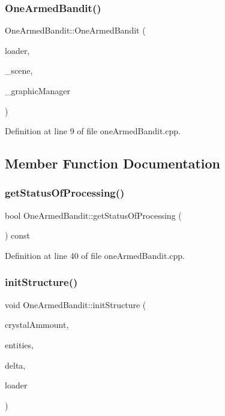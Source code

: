 \subsubsection{One\+Armed\+Bandit()}
{\footnotesize\ttfamily One\+Armed\+Bandit\+::\+One\+Armed\+Bandit (\begin{DoxyParamCaption}\item[{const std\+::shared\+\_\+ptr$<$ \textbf{ Loader} $>$ \&}]{loader,  }\item[{const std\+::shared\+\_\+ptr$<$ \textbf{ Scene} $>$ \&}]{\+\_\+scene,  }\item[{const std\+::shared\+\_\+ptr$<$ \textbf{ Graphic\+Manager} $>$ \&}]{\+\_\+graphic\+Manager }\end{DoxyParamCaption})}



Definition at line 9 of file one\+Armed\+Bandit.\+cpp.



\subsection{Member Function Documentation}
\mbox{\label{class_one_armed_bandit_a240e0cb1ec7774c515e8c2fd980d164d}} 
\subsubsection{get\+Status\+Of\+Processing()}
{\footnotesize\ttfamily bool One\+Armed\+Bandit\+::get\+Status\+Of\+Processing (\begin{DoxyParamCaption}{ }\end{DoxyParamCaption}) const}



Definition at line 40 of file one\+Armed\+Bandit.\+cpp.

\mbox{\label{class_one_armed_bandit_aa7406f5903fb347d94dfcd368100d8ec}} 
\subsubsection{init\+Structure()}
{\footnotesize\ttfamily void One\+Armed\+Bandit\+::init\+Structure (\begin{DoxyParamCaption}\item[{const \textbf{ Vector2}$<$ int8\+\_\+t $>$ \&}]{crystal\+Ammount,  }\item[{std\+::vector$<$ std\+::shared\+\_\+ptr$<$ \textbf{ mv\+::\+Entity} $>$$>$ \&}]{entities,  }\item[{const \textbf{ Vector2}$<$ float $>$ \&}]{delta,  }\item[{const std\+::shared\+\_\+ptr$<$ \textbf{ Loader} $>$ \&}]{loader }\end{DoxyParamCaption})}



